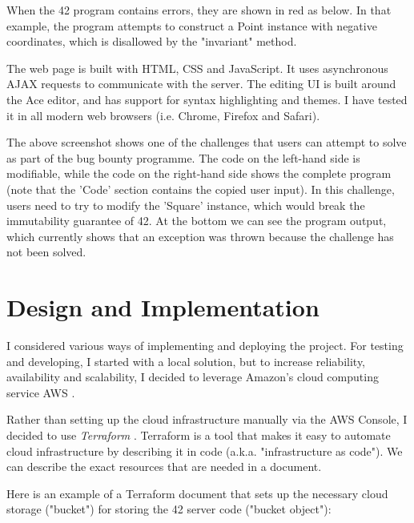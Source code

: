 
When the 42 program contains errors, they are shown in red as below. In that example, the program attempts to construct a Point instance with negative coordinates, which is disallowed by the "invariant" method.


The web page is built with HTML, CSS and JavaScript. It uses asynchronous AJAX requests to communicate with the server. The editing UI is built around the Ace editor, and has support for syntax highlighting and themes. I have tested it in all modern web browsers (i.e. Chrome, Firefox and Safari).


The above screenshot shows one of the challenges that users can attempt to solve as part of the bug bounty programme. The code on the left-hand side is modifiable, while the code on the right-hand side shows the complete program (note that the 'Code' section contains the copied user input). In this challenge, users need to try to modify the 'Square' instance, which would break the immutability guarantee of 42. At the bottom we can see the program output, which currently shows that an exception was thrown because the challenge has not been solved.

\chapter{Design and Implementation}


I considered various ways of implementing and deploying the project. For testing and developing, I started with a local solution, but to increase reliability, availability and scalability, I decided to leverage Amazon's cloud computing service AWS \cite{amazon-2022A}.

Rather than setting up the cloud infrastructure manually via the AWS Console, I decided to use \emph{Terraform} \cite{hashicorp-2022}. Terraform is a tool that makes it easy to automate cloud infrastructure by describing it in code (a.k.a. "infrastructure as code"). We can describe the exact resources that are needed in a document.

Here is an example of a Terraform document that sets up the necessary cloud storage ("bucket") for storing the 42 server code ("bucket object"):

